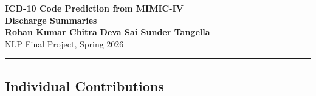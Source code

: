\documentclass[11pt,a4paper]{article}
\begin{document}
\begin{center}
    \vspace*{6pt}
    {\LARGE\bfseries ICD-10 Code Prediction from MIMIC-IV\\[4pt] Discharge Summaries}\\[16pt]
    {\large\textbf{Rohan Kumar Chitra} \quad\quad \textbf{Deva Sai Sunder Tangella}}\\[6pt]
    {\normalsize NLP Final Project, Spring 2026}
\end{center}

\vspace{6pt}
\noindent\rule{\textwidth}{1.0pt}

\subsection*{Individual Contributions}
\end{document}
